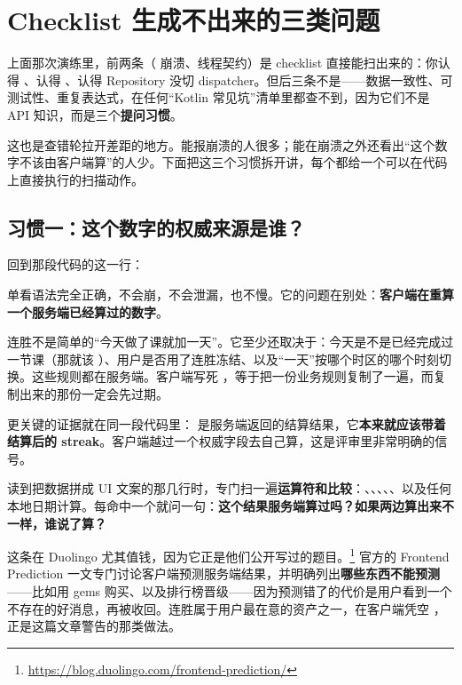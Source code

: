 \section{Checklist 生成不出来的三类问题}

上面那次演练里，前两条（\code{!!} 崩溃、线程契约）是 checklist 直接能扫出来的：你认得 \code{!!}、认得 、认得 Repository 没切 dispatcher。但后三条不是——数据一致性、可测试性、重复表达式，在任何“Kotlin 常见坑”清单里都查不到，因为它们不是 API 知识，而是三个\textbf{提问习惯}。

这也是查错轮拉开差距的地方。能报崩溃的人很多；能在崩溃之外还看出“这个数字不该由客户端算”的人少。下面把这三个习惯拆开讲，每个都给一个可以在代码上直接执行的扫描动作。

\subsection{习惯一：这个数字的权威来源是谁？}

回到那段代码的这一行：


单看语法完全正确，不会崩，不会泄漏，也不慢。它的问题在别处：\textbf{客户端在重算一个服务端已经算过的数字}。

连胜不是简单的“今天做了课就加一天”。它至少还取决于：今天是不是已经完成过一节课（那就该 ）、用户是否用了连胜冻结、以及“一天”按哪个时区的哪个时刻切换。这些规则都在服务端。客户端写死 ，等于把一份业务规则复制了一遍，而复制出来的那份一定会先过期。

更关键的证据就在同一段代码里： 是服务端返回的结算结果，它\textbf{本来就应该带着结算后的 streak}。客户端越过一个权威字段去自己算，这是评审里非常明确的信号。

\begin{idea}
读到把数据拼成 UI 文案的那几行时，专门扫一遍\textbf{运算符和比较}：、、、、、以及任何本地日期计算。每命中一个就问一句：\textbf{这个结果服务端算过吗？如果两边算出来不一样，谁说了算？}
\end{idea}

这条在 Duolingo 尤其值钱，因为它正是他们公开写过的题目。\srcofficial\footnote{\url{https://blog.duolingo.com/frontend-prediction/}} 官方的 Frontend Prediction 一文专门讨论客户端预测服务端结果，并明确列出\textbf{哪些东西不能预测}——比如用 gems 购买、以及排行榜晋级——因为预测错了的代价是用户看到一个不存在的好消息，再被收回。连胜属于用户最在意的资产之一，在客户端凭空 ，正是这篇文章警告的那类做法。

